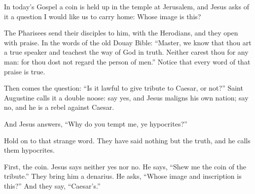 %

In today's Gospel a coin is held up in the temple at Jerusalem, and Jesus asks
of it a question I would like us to carry home: Whose image is this?

The Pharisees send their disciples to him, with the Herodians, and they open
with praise. In the words of the old Douay Bible: ``Master, we know that thou
art a true speaker and teachest the way of God in truth. Neither carest thou
for any man: for thou dost not regard the person of men.'' Notice that every
word of that praise is true.

Then comes the question: ``Is it lawful to give tribute to Caesar, or not?''
Saint Augustine calls it a double noose: say yes, and Jesus maligns his own
nation; say no, and he is a rebel against Caesar.

And Jesus answers, ``Why do you tempt me, ye hypocrites?''

Hold on to that strange word. They have said nothing but the truth, and he
calls them hypocrites.

\bigskip

First, the coin. Jesus says neither yes nor no. He says, ``Shew me the coin of
the tribute.'' They bring him a denarius. He asks, ``Whose image and
inscription is this?'' And they say, ``Caesar's.''

